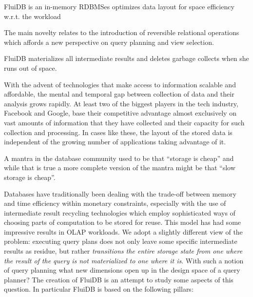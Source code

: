 
\begin{summary}
\item FluiDB is an in-memory RDBMSes optimizes data layout for space
  efficiency w.r.t. the workload
\item The main novelty relates to the introduction of reversible
  relational operations which affords a new perspective on query
  planning and view selection.
\item FluiDB materializes all intermediate results and deletes garbage
  collects when she runs out of space.
\end{summary}

With the advent of technologies that make access to information
scalable and affordable, the mental and temporal gap between
collection of data and their analysis grows rapidly. At least two of
the biggest players in the tech industry, Facebook and Google,
base their competitive advantage almost exclusively on vast amounts of
information that they have collected and their capacity for such
collection and processing. In cases like these, the layout of the
stored data is independent of the growing number of applications
taking advantage of it.

A mantra in the database community used to be that ``storage is cheap''
and while that is true a more complete version of the mantra might be
that ``slow storage is cheap''.

Databases have traditionally been dealing with the trade-off between
memory and time efficiency within monetary constraints, especially with
the use of intermediate result recycling technologies which employ
sophisticated ways of choosing parts of computation to be stored for
reuse. This model has had some impressive results in OLAP
workloads. We adopt a slightly different view of the problem:
executing query plans does not only leave some specific intermediate
results as residue, but rather \emph{transitions the entire storage
  state from one where the result of the query is not materialized to
  one where it is}. With such a notion of query planning what new
dimensions open up in the design space of a query planner? The creation
of FluiDB is an attempt to study some aspects of this question. In
particular FluiDB is based on the following pillars:

